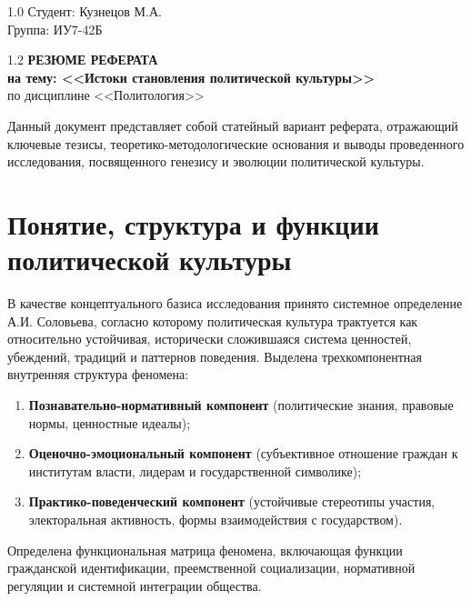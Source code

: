 \documentclass[14pt,a4paper]{extarticle}
\begin{document}
\begin{flushright}
    \begin{spacing}{1.0}
        {\large Студент: Кузнецов М.А.}\\
        {\large Группа: ИУ7-42Б}
    \end{spacing}
\end{flushright}

\vspace{0.5cm}

\begin{center}
    \begin{spacing}{1.2}
        {\bf\Large РЕЗЮМЕ РЕФЕРАТА} \\
        \vspace{0.2cm}
        {\bf\large на тему: <<Истоки становления политической культуры>>} \\
        \vspace{0.1cm}
        {\small по дисциплине <<Политология>>}
    \end{spacing}
\end{center}

\vspace{0.5cm}

Данный документ представляет собой статейный вариант реферата, отражающий ключевые тезисы, теоретико-методологические основания и выводы проведенного исследования, посвященного генезису и эволюции политической культуры.

\section{Понятие, структура и функции политической культуры}
В качестве концептуального базиса исследования принято системное определение А.И. Соловьева, согласно которому политическая культура трактуется как относительно устойчивая, исторически сложившаяся система ценностей, убеждений, традиций и паттернов поведения. Выделена трехкомпонентная внутренняя структура феномена:
\begin{enumerate}
    \item \textbf{Познавательно-нормативный компонент} (политические знания, правовые нормы, ценностные идеалы);
    \item \textbf{Оценочно-эмоциональный компонент} (субъективное отношение граждан к институтам власти, лидерам и государственной символике);
    \item \textbf{Практико-поведенческий компонент} (устойчивые стереотипы участия, электоральная активность, формы взаимодействия с государством).
\end{enumerate}
Определена функциональная матрица феномена, включающая функции гражданской идентификации, преемственной социализации, нормативной регуляции и системной интеграции общества.
\end{document}
